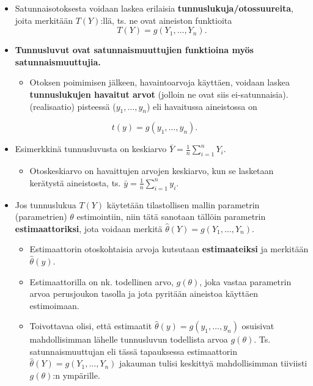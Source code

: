 \documentclass[
]{book}
\providecommand{\tightlist}{%
  \setlength{\itemsep}{0pt}\setlength{\parskip}{0pt}}
\begin{document}
\begin{itemize}
\item
  Satunnaisotoksesta voidaan laskea erilaisia \textbf{tunnuslukuja/otossuureita}, joita merkitään \(T(Y)\):llä, ts. ne ovat aineiston funktioita
  \[
  T(Y) = g(Y_1, \ldots, Y_n).
  \]
\item
  \textbf{Tunnusluvut ovat satunnaismuuttujien funktioina myös satunnaismuuttujia.}

  \begin{itemize}
  \tightlist
  \item
    Otoksen poimimisen jälkeen, havaintoarvoja käyttäen, voidaan laskea \textbf{tunnuslukujen havaitut arvot} (jolloin ne ovat siis ei-satunnaisia). (realisaatio) pisteessä (\(y_1,\ldots, y_n\)) eli havaitussa aineistossa on
  \end{itemize}
\end{itemize}

\[
t(y) = g(y_1, \ldots, y_n).
\]

\begin{itemize}
\tightlist
\item
  Esimerkkinä tunnusluvusta on keskiarvo \(\bar{Y} = \frac{1}{n} \sum_{i=1}^{n} Y_i\).

  \begin{itemize}
  \tightlist
  \item
    Otoskeskiarvo on havaittujen arvojen keskiarvo, kun se lasketaan kerätystä aineistosta, ts. \(\bar{y} = \frac{1}{n} \sum_{i=1}^{n} y_i\).
  \end{itemize}
\item
  Jos tunnuslukua \(T(Y)\) käytetään tilastollisen mallin parametrin (parametrien) \(\theta\) estimointiin, niin tätä sanotaan tällöin parametrin \textbf{estimaattoriksi}, jota voidaan merkitä \(\widehat{\theta}(Y) = g(Y_1,\dots,Y_n)\).

  \begin{itemize}
  \tightlist
  \item
    Estimaattorin otoskohtaisia arvoja kutsutaan \textbf{estimaateiksi} ja merkitään \(\widehat{\theta}(y)\).
  \item
    Estimaattorilla on nk. todellinen arvo, \(g(\theta)\), joka vastaa parametrin arvoa perusjoukon tasolla ja jota pyritään aineistoa käyttäen estimoimaan.
  \item
    Toivottavaa olisi, että estimaatit \(\widehat{\theta}(y) = g(y_1, \ldots, y_n)\) osuisivat mahdollisimman lähelle tunnusluvun todellista arvoa \(g(\theta)\). Ts. satunnaismuuttujan eli tässä tapauksessa estimaattorin \(\widehat{\theta}(Y)=g(Y_1, \ldots, Y_n)\) jakauman tulisi keskittyä mahdollisimman tiiviisti \(g(\theta)\):n ympärille.
  \end{itemize}
\end{itemize}
\end{document}
